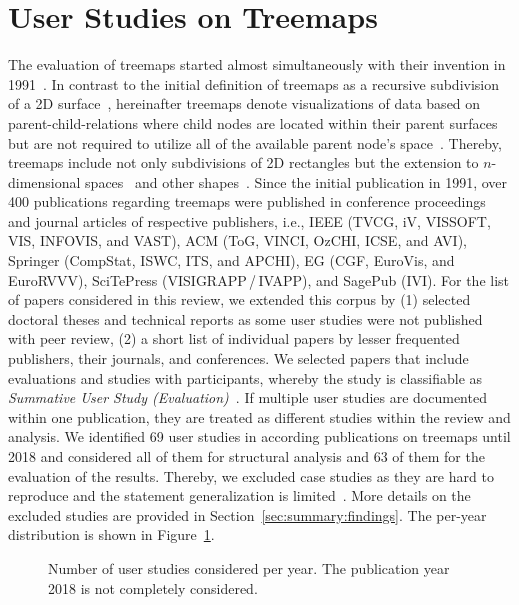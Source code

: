 \documentclass[sigconf,
natbib=true]{acmart}
\begin{document}
\section{User Studies on Treemaps} %
\label{sec:summary}



The evaluation of treemaps started almost simultaneously with their invention in 1991~\cite{turo1992-improve,johnson1993-categorical}.
In contrast to the initial definition of treemaps as a recursive subdivision of a 2D surface~\cite{johnson1991-spacefilling}, hereinafter treemaps denote visualizations of data based on parent-child-relations where child nodes are located within their parent surfaces but are not required to utilize all of the available parent node's space~\cite{bederson2002-quantum}.
Thereby, treemaps include not only subdivisions of 2D rectangles but the extension to $n$-dimensional spaces~\cite{johnson1993-categorical} and other shapes~\cite{wattenberg2005-spacefillingcurves,balzer2005-voronoi,auber2013-gospermap}.
Since the initial publication in 1991, over 400 publications regarding treemaps were published in conference proceedings and journal articles of respective publishers, i.e., IEEE (TVCG, iV, VISSOFT, VIS, INFOVIS, and VAST), ACM (ToG, VINCI, OzCHI, ICSE, and AVI), Springer (CompStat, ISWC, ITS, and APCHI), EG (CGF, EuroVis, and EuroRVVV), SciTePress (VISIGRAPP\,/\,IVAPP), and SagePub (IVI).
For the list of papers considered in this review, we extended this corpus by (1) selected doctoral theses and technical reports as some user studies were not published with peer review, (2) a short list of individual papers by lesser frequented publishers, their journals, and conferences.
We selected papers that include evaluations and studies with participants, whereby the study is classifiable as \emph{Summative User Study (Evaluation)}~\cite{munzner2008-pitfalls}.
If multiple user studies are documented within one publication, they are treated as different studies within the review and analysis.
We identified 69 user studies in according publications on treemaps until 2018 and considered all of them for structural analysis and 63 of them for the evaluation of the results.
Thereby, we excluded case studies as they are hard to reproduce and the statement generalization is limited~\cite{plaisant2004-evaluation}.
More details on the excluded studies are provided in Section~\ref{sec:summary:findings}. 
The per-year distribution is shown in Figure~\ref{fig:studycount}.
\begin{figure}[t]%
	\centering%
	\vspace{-1.0em}
	\caption{Number of user studies considered per year. The publication year 2018 is not completely considered.}%
	\label{fig:studycount}%
\end{figure}%
\end{document}
